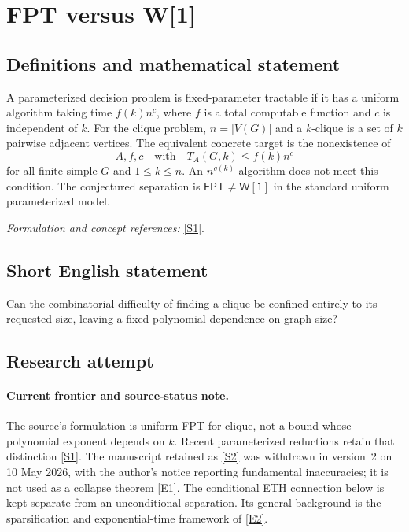 \documentclass[11pt,a4paper]{article}
\numberwithin{equation}{section}
\newcommand{\sref}[2]{\hyperlink{source:#1:#2}{[S#2]}}
\newcommand{\eref}[2]{\hyperlink{extra:#1:#2}{[E#2]}}
\newif\ifshowcatalogue
\newcommand{\cataloguescope}[1]{\ifshowcatalogue
 \paragraph{Exact scope in the supplied catalogue.}
 \begin{quote}\small #1\end{quote}\fi}
\begin{document}
\setcounter{section}{0}
\section*{\texorpdfstring{FPT versus W[1]}{FPT versus W[1]}}\label{statement}
\subsection{Definitions and mathematical statement}
A parameterized decision problem is fixed-parameter tractable if it has a uniform algorithm taking time $f(k)n^c$, where $f$ is a total computable function and $c$ is independent of $k$. For the clique problem, $n=|V(G)|$ and a $k$-clique is a set of $k$ pairwise adjacent vertices. The equivalent concrete target is the nonexistence of
\[
 A,f,c\quad\text{with}\quad T_A(G,k)\le f(k)n^c
\]
for all finite simple $G$ and $1\le k\le n$. An $n^{g(k)}$ algorithm does not meet this condition. The conjectured separation is $\mathsf{FPT}\ne\mathsf{W[1]}$ in the standard uniform parameterized model.
\par\smallskip\textit{Formulation and concept references:} \sref{statement}{1}.
\cataloguescope{Prove or disprove FPT!=W[1] in classical uniform parameterized complexity. Equivalently, determine whether there is a deterministic algorithm, a total computable function f:N->N and an absolute constant c such that on every finite simple n-vertex graph G and every integer 1<=k<=n it decides the existence of a k-clique within f(k)n\textasciicircum{}c steps. The conjecture asserts no such algorithm. The function and exponent are fixed with the algorithm; no input-length advice, oracle or nonuniform circuit family is allowed.}
\subsection{Short English statement}
Can the combinatorial difficulty of finding a clique be confined entirely to its requested size, leaving a fixed polynomial dependence on graph size?
\subsection{Research attempt}

\paragraph{Current frontier and source-status note.}
The source's formulation is uniform FPT for clique, not a bound whose
polynomial exponent depends on $k$. Recent parameterized reductions retain
that distinction \sref{statement}{1}. The manuscript retained as \sref{statement}{2}
was withdrawn in version~2 on 10 May 2026, with the author's notice reporting
fundamental inaccuracies; it is not used as a collapse theorem
\eref{statement}{1}. The conditional ETH connection below is kept separate from
an unconditional separation. Its general background is the sparsification
and exponential-time framework of \eref{statement}{2}.
\end{document}
